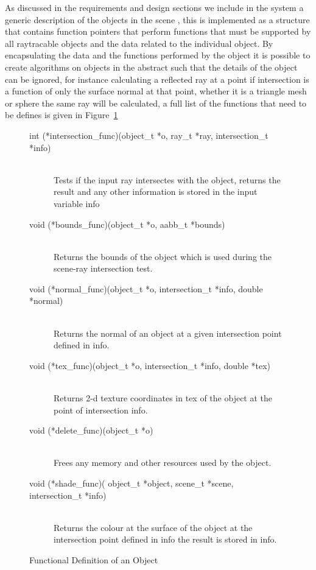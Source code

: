 As discussed in the requirements and design sections we include in the system a generic description of the objects in the
scene , this is implemented as a structure that contains function pointers that perform functions
that must be supported by all raytracable objects and the data related to the individual object.
By encapsulating the data and the functions performed by the object it is possible to create algorithms on objects in the
abstract such that the details of the object can be ignored, for instance calculating a reflected ray at a point if intersection
is a function of only the surface normal at that point, whether it is a triangle mesh or sphere the same ray will be calculated,
a full list of the functions that need to be defines is given in Figure~\ref{fig:object_funcs}

\begin{figure}[h]
\begin{description}
\item[int  (*intersection\_func)(object\_t *o, ray\_t *ray, intersection\_t *info)] \hfill \\
	Tests if the input ray intersectes with the object, returns the result and any other information is stored in the input variable info
\item[void (*bounds\_func)(object\_t *o, aabb\_t *bounds)] \hfill \\
	Returns the bounds of the object which is used during the scene-ray intersection test.
\item[void (*normal\_func)(object\_t *o, intersection\_t *info, double *normal)] \hfill \\
	Returns the normal of an object at a given intersection point defined in info.
\item[void (*tex\_func)(object\_t *o, intersection\_t *info, double *tex)] \hfill \\
	Returns 2-d texture coordinates in tex of the object at the point of intersection info.
\item[void (*delete\_func)(object\_t *o)] \hfill \\
	Frees any memory and other resources used by the object.
\item[void (*shade\_func)( object\_t *object, scene\_t *scene, intersection\_t *info)] \hfill \\
	Returns the colour at the surface of the object at the intersection point defined in info the result is stored in info.
\end{description}
\caption{Functional Definition of an Object}
\label{fig:object_funcs}
\end{figure}


